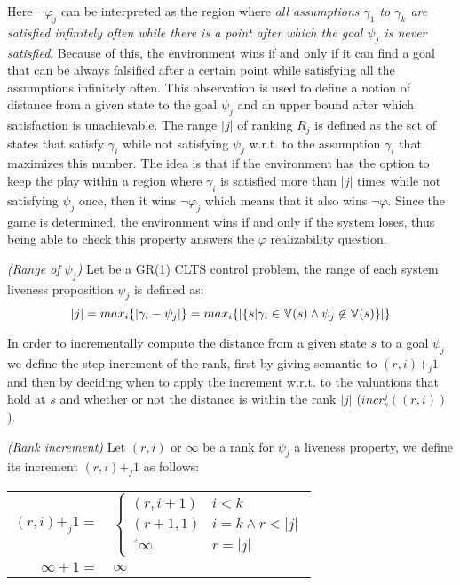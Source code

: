 Here $\neg\varphi_j$ can be interpreted as the region where \emph{all assumptions $\gamma_1$ to $\gamma_k$ are satisfied infinitely often while there is a point after which the goal $\psi_j$ is never satisfied}. Because of this, the environment wins if and only if it can find a goal that can be always falsified after a certain point while satisfying all the assumptions infinitely often. This observation is used to define a notion of distance from a given state to the goal $\psi_j$ and an upper bound after which satisfaction is unachievable. The range $|j|$ of ranking $R_j$ is defined as the set of states that satisfy $\gamma_i$ while not satisfying $\psi_j$ w.r.t. to the assumption $\gamma_i$ that maximizes this number. The idea is that if the environment has the option to keep the play within a region where $\gamma_i$ is satisfied more than $|j|$ times while not satisfying $\psi_j$ once, then it wins $\neg\varphi_j$ which means that it also wins $\neg\varphi$.  Since the game is determined, the environment wins if and only if the system loses, thus being able to check this property answers the $\varphi$ realizability question.


\begin{definition}\label{def:gr1_range_j} \emph{(Range of $\psi_j$)} 
Let \controlProblemDef be a GR(1) CLTS control problem, the range of each system liveness proposition $\psi_j$ is defined as:
\[|j|=max_i\{|\gamma_i - \psi_j|\} = max_i \{ | \{ s | \gamma_i \in \mathbb{V} (s) \wedge  \psi_j \not\in \mathbb{V} (s) \} | \} \]
\end{definition}

In order to incrementally compute the distance from a given state $s$ to a goal $\psi_j$ we define the step-increment of the rank, first by giving semantic to $(r,i)+_j 1$ and then by deciding when to apply the increment w.r.t. to the valuations that hold at $s$ and whether or not the distance is within the rank $|j|$ ($incr_s^j((r,i))$).

\begin{definition}\label{def:gr1_rank_increment} \emph{(Rank increment)} 
	Let $(r,i)$ or $\infty$ be a rank for $\psi_j$ a liveness property, we define its increment $(r,i)+_j 1$ as follows:
\begin{center}
	\begin{tabular}{r l}
		$(r,i)+_j 1 = $ & $\begin{cases}
		(r,i+1) & i < k\\
		(r+1,1) & i = k \wedge r < |j|\\
		´\infty & r = |j|
		\end{cases}$\\
		$\infty + 1 = $ & $\infty$\\
	\end{tabular}
\end{center}
\end{definition}



